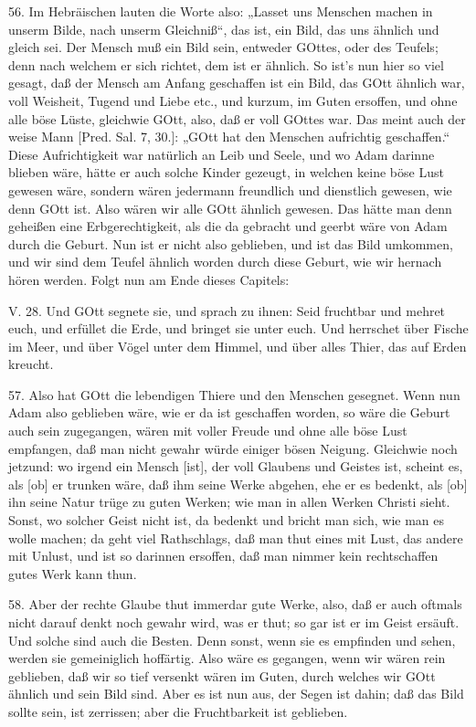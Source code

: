 56. Im Hebräischen lauten die Worte also: „Lasset uns Menschen machen in unserm Bilde, nach unserm Gleichniß“, das ist, ein Bild, das uns ähnlich und gleich sei. Der Mensch muß ein Bild sein, entweder GOttes, oder des Teufels; denn nach welchem er sich richtet, dem ist er ähnlich. So ist’s nun hier so viel gesagt, daß der Mensch am Anfang geschaffen ist ein Bild, das GOtt ähnlich war, voll Weisheit, Tugend und Liebe etc., und kurzum, im Guten ersoffen, und ohne alle böse Lüste, gleichwie GOtt, also, daß er voll GOttes war. Das meint auch der weise Mann [Pred. Sal. 7, 30.]: „GOtt hat den Menschen aufrichtig geschaffen.“ Diese Aufrichtigkeit war natürlich an Leib und Seele, und wo Adam darinne blieben wäre, hätte er auch solche Kinder gezeugt, in welchen keine böse Lust gewesen wäre, sondern wären jedermann freundlich und dienstlich gewesen, wie denn GOtt ist. Also wären wir alle GOtt ähnlich gewesen. Das hätte man denn geheißen eine Erbgerechtigkeit, als die da gebracht und geerbt wäre von Adam durch die Geburt. Nun ist er nicht also geblieben, und ist das Bild umkommen, und wir sind dem Teufel ähnlich worden durch diese Geburt, wie wir hernach hören werden. Folgt nun am Ende dieses Capitels:

\begin{schriftzitat}
V. 28. Und GOtt segnete sie, und sprach zu ihnen: Seid fruchtbar und mehret euch, und erfüllet die Erde, und bringet sie unter euch. Und herrschet über Fische im Meer, und über Vögel unter dem Himmel, und über alles Thier, das auf Erden kreucht.
\end{schriftzitat}

57. Also hat GOtt die lebendigen Thiere und den Menschen gesegnet. Wenn nun Adam also geblieben wäre, wie er da ist geschaffen worden, so wäre die Geburt auch sein zugegangen, wären mit voller Freude und ohne alle böse Lust empfangen, daß man nicht gewahr würde einiger bösen Neigung. Gleichwie noch jetzund: wo irgend ein Mensch [ist], der voll Glaubens und Geistes ist, scheint es, als [ob] er trunken wäre, daß ihm seine Werke abgehen, ehe er es bedenkt, als [ob] ihn seine Natur trüge zu guten Werken; wie man in allen Werken Christi sieht. Sonst, wo solcher Geist nicht ist, da bedenkt und bricht man sich, wie man es wolle machen; da geht viel Rathschlags, daß man thut eines mit Lust, das andere mit Unlust, und ist so darinnen ersoffen, daß man nimmer kein rechtschaffen gutes Werk kann thun.

58. Aber der rechte Glaube thut immerdar gute Werke, also, daß er auch oftmals nicht darauf denkt noch gewahr wird, was er thut; so
gar ist er im Geist ersäuft. Und solche sind auch die Besten. Denn sonst, wenn sie es empfinden und sehen, werden sie gemeiniglich hoffärtig. Also wäre es gegangen, wenn wir wären rein geblieben, daß wir so tief versenkt wären im Guten, durch welches wir GOtt ähnlich und sein Bild sind. Aber es ist nun aus, der Segen ist dahin; daß das Bild sollte sein, ist zerrissen; aber die Fruchtbarkeit ist geblieben.

